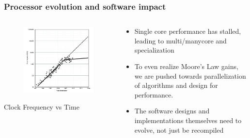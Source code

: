\begin{frame}
\frametitle{Processor evolution and software impact}

\begin{columns}[T] %

\begin{column}{.48\textwidth}
\begin{figure}[htbp]
\begin{center}
\includegraphics[width=1.0\textwidth]{images/moore2.png}
\end{center}
\end{figure}
\begin{center}
\small{Clock Frequency vs Time}
\end{center}
\end{column}%

\hfill%

\begin{column}{.48\textwidth}
\begin{itemize}
\item Single core performance has stalled, leading to multi/manycore and specialization
\item To even realize Moore's Law gains, we are pushed towards parallelization of algorithms and design for performance.
\item The software designs and implementations themselves need to evolve, not just be recompiled
\end{itemize}
\end{column}%

\end{columns}

\end{frame}


